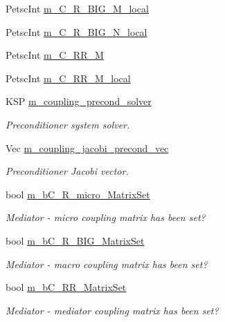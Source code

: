 \begin{DoxyCompactItemize}
Petsc\+Int \hyperlink{classcarl_1_1_f_e_t_i___operations_adb43af921deb83b507b3af27d7ac2e1f}{m\+\_\+\+C\+\_\+\+R\+\_\+\+B\+I\+G\+\_\+\+M\+\_\+local}
\item 
Petsc\+Int \hyperlink{classcarl_1_1_f_e_t_i___operations_a87856fb17203f71c386d800b1021e483}{m\+\_\+\+C\+\_\+\+R\+\_\+\+B\+I\+G\+\_\+\+N\+\_\+local}
\item 
Petsc\+Int \hyperlink{classcarl_1_1_f_e_t_i___operations_a8212c6fec9ded9faeb36cc3ce18f2e35}{m\+\_\+\+C\+\_\+\+R\+R\+\_\+\+M}
\item 
Petsc\+Int \hyperlink{classcarl_1_1_f_e_t_i___operations_a2401278970b5cc7087ebbf1746c64d35}{m\+\_\+\+C\+\_\+\+R\+R\+\_\+\+M\+\_\+local}
\item 
K\+S\+P \hyperlink{classcarl_1_1_f_e_t_i___operations_a46747376395ca3167a318a3ce6f6da51}{m\+\_\+coupling\+\_\+precond\+\_\+solver}
\begin{DoxyCompactList}\small\item\em Preconditioner system solver. \end{DoxyCompactList}\item 
Vec \hyperlink{classcarl_1_1_f_e_t_i___operations_a1d88407c07e4b6a4802e2f4e49015b32}{m\+\_\+coupling\+\_\+jacobi\+\_\+precond\+\_\+vec}
\begin{DoxyCompactList}\small\item\em Preconditioner Jacobi vector. \end{DoxyCompactList}\item 
bool \hyperlink{classcarl_1_1_f_e_t_i___operations_adc75fb521a7adb09783a446896180e73}{m\+\_\+b\+C\+\_\+\+R\+\_\+micro\+\_\+\+Matrix\+Set}
\begin{DoxyCompactList}\small\item\em Mediator -\/ micro coupling matrix has been set? \end{DoxyCompactList}\item 
bool \hyperlink{classcarl_1_1_f_e_t_i___operations_a2fbc3a5e789caab1c636fdc86304023e}{m\+\_\+b\+C\+\_\+\+R\+\_\+\+B\+I\+G\+\_\+\+Matrix\+Set}
\begin{DoxyCompactList}\small\item\em Mediator -\/ macro coupling matrix has been set? \end{DoxyCompactList}\item 
bool \hyperlink{classcarl_1_1_f_e_t_i___operations_a1f272a523aba46755b2883394947bde0}{m\+\_\+b\+C\+\_\+\+R\+R\+\_\+\+Matrix\+Set}
\begin{DoxyCompactList}\small\item\em Mediator -\/ mediator coupling matrix has been set? \end{DoxyCompactList}\item 

\end{DoxyCompactItemize}
